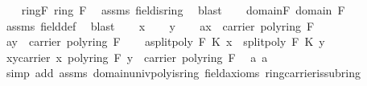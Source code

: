 \begin{isabellebody}
%
\isadelimproof
%
\endisadelimproof
%
\isatagproof
{}\isamarkupfalse%
\isanewline
\ \ \isamarkupfalse%
\ ring{\isacharunderscore}{\kern0pt}F{\isacharcolon}{\kern0pt}\ {\isachardoublequoteopen}ring\ F{\isachardoublequoteclose}\ \isamarkupfalse%
\ assms{\isacharparenleft}{\kern0pt}{}{\isacharparenright}{\kern0pt}\ field{\isachardot}{\kern0pt}is{\isacharunderscore}{\kern0pt}ring\ \isamarkupfalse%
\ blast\isanewline
\ \ \isamarkupfalse%
\ domain{\isacharunderscore}{\kern0pt}F{\isacharcolon}{\kern0pt}\ {\isachardoublequoteopen}domain\ F{\isachardoublequoteclose}\ \isamarkupfalse%
\ assms{\isacharparenleft}{\kern0pt}{}{\isacharparenright}{\kern0pt}\ field{\isacharunderscore}{\kern0pt}def\ \isamarkupfalse%
\ blast\isanewline
\ \ \isamarkupfalse%
\ x\isanewline
\ \ \isamarkupfalse%
\ y\isanewline
\ \ \isamarkupfalse%
\ a{}{\isacharcolon}{\kern0pt}{\isachardoublequoteopen}x\ {\isasymin}\ carrier\ {\isacharparenleft}{\kern0pt}poly{\isacharunderscore}{\kern0pt}ring\ F{\isacharparenright}{\kern0pt}{\isachardoublequoteclose}\isanewline
\ \ \isamarkupfalse%
\ a{}{\isacharcolon}{\kern0pt}{\isachardoublequoteopen}y\ {\isasymin}\ carrier\ {\isacharparenleft}{\kern0pt}poly{\isacharunderscore}{\kern0pt}ring\ F{\isacharparenright}{\kern0pt}{\isachardoublequoteclose}\isanewline
\ \ \isamarkupfalse%
\ a{}{\isacharcolon}{\kern0pt}{\isachardoublequoteopen}split{\isacharunderscore}{\kern0pt}poly\ F\ K\ x\ {\isacharequal}{\kern0pt}\ split{\isacharunderscore}{\kern0pt}poly\ F\ K\ y{\isachardoublequoteclose}\isanewline
\isanewline
\ \ \isamarkupfalse%
\ x{\isacharunderscore}{\kern0pt}y{\isacharunderscore}{\kern0pt}carrier{\isacharcolon}{\kern0pt}\ {\isachardoublequoteopen}x\ {\isasymominus}\isactrlbsub poly{\isacharunderscore}{\kern0pt}ring\ F\isactrlesub \ y\ {\isasymin}\ carrier\ {\isacharparenleft}{\kern0pt}poly{\isacharunderscore}{\kern0pt}ring\ F{\isacharparenright}{\kern0pt}{\isachardoublequoteclose}\ \isamarkupfalse%
\ a{}\ a{}\isanewline
\ \ \ \ \isamarkupfalse%
\ {\isacharparenleft}{\kern0pt}simp\ add{\isacharcolon}{\kern0pt}\ assms{\isacharparenleft}{\kern0pt}{}{\isacharparenright}{\kern0pt}\ domain{\isachardot}{\kern0pt}univ{\isacharunderscore}{\kern0pt}poly{\isacharunderscore}{\kern0pt}is{\isacharunderscore}{\kern0pt}ring\ field{\isachardot}{\kern0pt}axioms{\isacharparenleft}{\kern0pt}{}{\isacharparenright}{\kern0pt}\ ring{\isachardot}{\kern0pt}carrier{\isacharunderscore}{\kern0pt}is{\isacharunderscore}{\kern0pt}subring\ \isanewline

\end{isabellebody}
